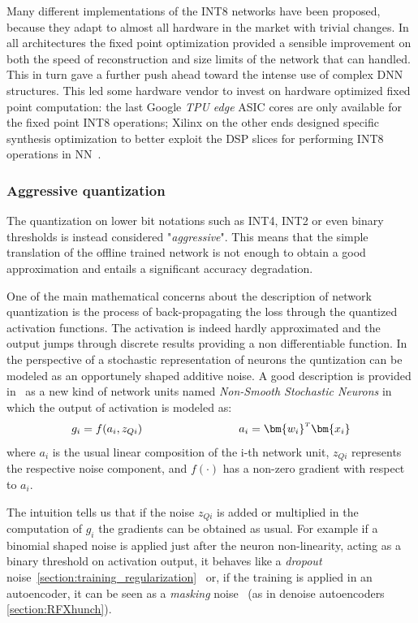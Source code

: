 Many different implementations of the INT8 networks have been proposed, because they adapt to almost all hardware in the market with trivial changes. In all architectures the fixed point optimization provided a sensible improvement on both the speed of reconstruction and size limits of the network that can handled. This in turn gave a further push ahead toward the intense use of complex DNN structures.
This led some hardware vendor to invest on hardware optimized fixed point computation: the last Google \textit{TPU edge} ASIC cores are only available for the fixed point INT8 operations; Xilinx on the other ends designed specific synthesis optimization to better exploit the DSP slices for performing INT8 operations in NN~\cite{xilinx_INT8_DNN}.


\subsubsection{Aggressive quantization}

The quantization on lower bit notations such as INT4, INT2 or even binary thresholds is instead considered "\textit{aggressive}". 
This means that the simple translation of the offline trained network is not enough to obtain a good approximation and entails a significant accuracy degradation.

One of the main mathematical concerns about the description of network quantization is the process of back-propagating the loss through the quantized activation functions. The activation is indeed hardly approximated and the output jumps through discrete results providing a non differentiable function. In the perspective of a stochastic representation of neurons the quntization can be modeled as an opportunely shaped additive noise. A good description is provided in~\cite{bengio2013estimating} as a new kind of network units named \textit{Non-Smooth Stochastic Neurons} in which the output of activation is modeled as:
\begin{equation}
    g_i = f(a_i, z_{Qi})  \hspace{3cm}  a_i = \transpose{\bm{w_i}}\bm{x_i}
\end{equation}
where $a_i$ is the usual linear composition of the i-th network unit, $z_{Qi}$ represents the respective noise component, and $f(\cdot)$ has a non-zero gradient with respect to $a_i$.

The intuition tells us that if the noise $z_{Qi}$ is added or multiplied in the computation of $g_i$ the gradients can be obtained as usual. 
For example if a binomial shaped noise is applied just after the neuron non-linearity, acting as a binary threshold on activation output, it behaves like a \textit{dropout} noise~\cref{section:training_regularization}~\cite{Srivastava:2014:DSW:2627435.2670313} or, if the training is applied in an autoencoder, it can be seen as a \textit{masking} noise~\cite{vincent_et_al_denoise2008} (as in denoise autoencoders \cref{section:RFXhunch}).

